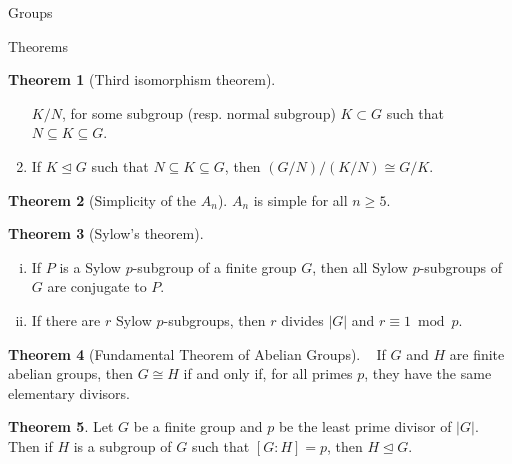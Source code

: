 \documentclass{article}
\theoremstyle{definition}
\newtheorem{theorem}{Theorem}
\numberwithin{theorem}{subsection} %
\theoremstyle{remark}
\theoremstyle{definition}
\begin{document}
\begin{section}{Groups}
\begin{subsection}{Theorems}
\begin{theorem}[Third isomorphism theorem]
\begin{enumerate}
        $K/N$, for some subgroup (resp. normal subgroup) $K \subset G$ such that
        $N \subseteq K \subseteq G$.
        \item If $K \trianglelefteq G$ such that $N \subseteq K \subseteq G$,
        then $(G/N)/(K/N) \cong G/K$.
      \end{enumerate}
    \end{theorem}
    \begin{theorem}[Simplicity of the $A_n$] %
      $A_n$ is simple for all $n \geq 5$.
    \end{theorem}
    \begin{theorem}[Sylow's theorem] ~ %
      \begin{enumerate}[(i)]
        \item If $P$ is a Sylow $p$-subgroup of a finite group $G$, then all
        Sylow $p$-subgroups of $G$ are conjugate to $P$.
        \item If there are $r$ Sylow $p$-subgroups, then $r$ divides $|G|$ and
        $r \equiv 1 \bmod p$.
      \end{enumerate}
    \end{theorem}
    \begin{theorem}[Fundamental Theorem of Abelian Groups] ~ %
      If $G$ and $H$ are finite abelian groups, then $G \cong H$ if and only if,
      for all primes $p$, they have the same elementary divisors.
    \end{theorem}
    \begin{theorem} %
      Let $G$ be a finite group and $p$ be the least prime divisor of $|G|$.
      Then if $H$ is a subgroup of $G$ such that $[G: H] = p$,
      then $H \trianglelefteq G$.
    \end{theorem}
  \end{subsection}
\end{section}
\pagebreak
\end{document}
